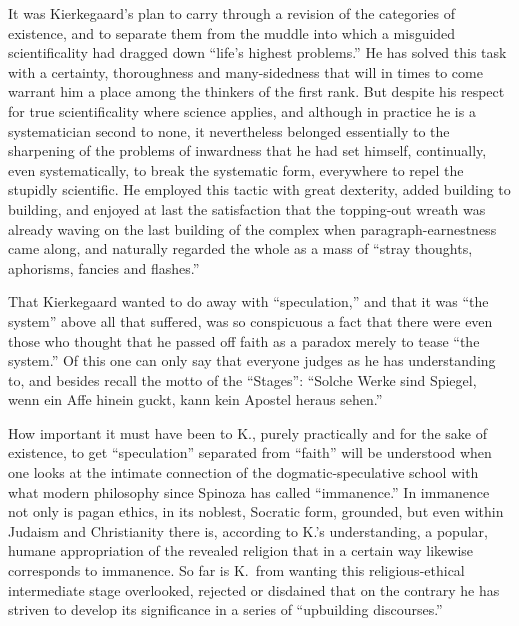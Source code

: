 \documentclass[12pt,a4paper]{article}
\newcommand{\opage}[1]{\marginnote{\footnotesize\textit{[#1]}}}
\begin{document}
It was Kierkegaard's plan to carry through a revision
of the categories of existence, and to separate them from the
muddle into which a misguided scientificality had
dragged down ``life's highest problems.'' He has solved
this task with a certainty, thoroughness and many-sidedness
that will in times to come warrant him a place
among the thinkers of the first rank. But despite his respect
for true scientificality where science applies,
and although in practice he is a systematician second to none,
it nevertheless belonged essentially to the sharpening of the problems of inwardness
that he had set himself, continually, even
systematically, to break the systematic form, everywhere to repel
the stupidly scientific. He employed this tactic
with great dexterity, added building to building, and enjoyed
at last the satisfaction that the topping-out wreath was already waving
on the last building of the complex when paragraph-earnestness came
along, and naturally regarded the whole as a mass of ``stray
thoughts, aphorisms, fancies and flashes.''

That Kierkegaard wanted to do away with ``speculation,'' and that
it was ``the system'' above all that suffered, was so conspicuous
a fact that there were even those who thought that
\opage{9}
he passed off faith as a paradox merely to tease ``the system.''
Of this one can only say that everyone judges
as he has understanding to, and besides recall the motto of the ``Stages'':
``Solche Werke sind Spiegel, wenn ein Affe
hinein guckt, kann kein Apostel heraus sehen.''

How important it must have been to K., purely
practically and for the sake of existence, to get ``speculation''
separated from ``faith'' will be understood when one
looks at the intimate connection of the dogmatic-speculative school
with what modern philosophy since Spinoza
has called ``immanence.'' In immanence
not only is pagan ethics, in its noblest, Socratic
form, grounded, but even within Judaism and Christianity
there is, according to K.'s understanding, a popular, humane
appropriation of the revealed religion that in a
certain way likewise corresponds to immanence. So far is
K.\ from wanting this religious-ethical intermediate
stage overlooked, rejected or disdained that on the contrary
he has striven to develop its significance in a series
of ``upbuilding discourses.''
\end{document}
